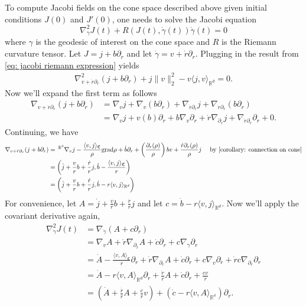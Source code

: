\documentclass{article}
\begin{document}
To compute Jacobi fields on the cone space described above given initial conditions $J(0)$ and $J'(0)$, one needs to solve the Jacobi equation
\begin{equation}
    \nabla_{\dot\gamma}^2J(t) + R(J(t), \dot{\gamma}(t))\dot{\gamma}(t) = 0
\end{equation}
where $\gamma$ is the geodesic of interest on the cone space and $R$ is the Riemann curvature tensor. Let $J = j + b\partial_r$ and let $\dot\gamma = v + \dot r \partial_r$. Plugging in the result from \cref{eq: jacobi riemann expression} yields
\begin{align}
    \nabla_{v + \dot r \partial_r}^2(j + b\partial_r) + j\|v\|^2_{2} - v\langle j,v\rangle_{\mathbb{R}^d} = 0.
\end{align}
Now we'll expand the first term as follows
\begin{align}
    \nabla_{v + \dot r \partial_r}(j + b\partial_r) &= \nabla_vj + \nabla_v(b\partial_r) + \nabla_{\dot r\partial_r}j + \nabla_{\dot r\partial_r}(b\partial_r) \\
    &= \nabla_vj + v(b)\partial_r + b\nabla_v\partial_r + \dot r\nabla_{\partial_r}j + \nabla_{\dot r\partial_r}\partial_r + 0.
\end{align}
Continuing, we have
\begin{align}
    \nabla_{v + \dot r \partial_r}(j + b\partial_r)&= \,^{\mathbb{R}^d}\nabla_vj - \frac{\langle v, j\rangle_{\mathfrak{C}}}{\rho}\text{grad}\rho + \dot b\partial_r +  \left(\frac{\partial_r(\rho)}{\rho}\right)bv  + \frac{\dot r\partial_r(\rho)}{\rho}j & \text{ by \Cref{corollary: connection on cone}}\\
    &= \left(\dot j + \frac{v}{r}b  + \frac{\dot r}{r}j, \dot b - \frac{\langle v, j\rangle_{\mathfrak{C}}}{r}\right) \\
    &= \left(\dot j + \frac{v}{r}b  + \frac{\dot r}{r}j, \dot b - r\langle v, j\rangle_{\mathbb{R}^d}\right)
\end{align}
For convenience, let $A = \dot j + \frac{v}{r}b  + \frac{\dot r}{r}j$ and let $c = \dot b - r\langle v, j\rangle_{\mathbb{R}^d}$. Now we'll apply the covariant derivative again,
\begin{align}
    \nabla^2_{\dot\gamma}J(t) &= \nabla_{\dot\gamma}(A + c\partial_r) \\
    &= \nabla_v A + \dot r\nabla_{\partial_r}A + \dot c\partial_r + c\nabla_{\dot\gamma}\partial_r\\
    &= \dot A  - \frac{\langle v, A\rangle_{\mathfrak{C}}}{r}\partial_r + \dot r\nabla_{\partial_r}A + \dot c\partial_r + c\nabla_{v}\partial_r + \dot rc\nabla_{\partial_r}\partial_r \\
    &= \dot A  - r\langle v, A\rangle_{\mathbb{R}^d}\partial_r + \frac{\dot r}{r}A + \dot c\partial_r + \frac{cv}{r} \\
    &= \left(\dot A  + \frac{\dot r}{r}A + \frac{c}{r}v\right) + \left(\dot c - r\langle v, A \rangle_{\mathbb{R^d}}\right)\partial_r.
\end{align}
\end{document}
